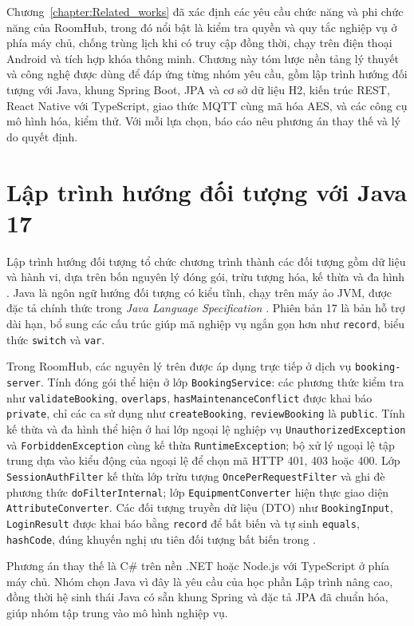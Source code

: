 \documentclass[../DoAn.tex]{subfiles}
\begin{document}
Chương~\ref{chapter:Related_works} đã xác định các yêu cầu chức năng và phi chức năng của RoomHub, trong đó nổi bật là kiểm tra quyền và quy tắc nghiệp vụ ở phía máy chủ, chống trùng lịch khi có truy cập đồng thời, chạy trên điện thoại Android và tích hợp khóa thông minh. Chương này tóm lược nền tảng lý thuyết và công nghệ được dùng để đáp ứng từng nhóm yêu cầu, gồm lập trình hướng đối tượng với Java, khung Spring Boot, JPA và cơ sở dữ liệu H2, kiến trúc REST, React Native với TypeScript, giao thức MQTT cùng mã hóa AES, và các công cụ mô hình hóa, kiểm thử. Với mỗi lựa chọn, báo cáo nêu phương án thay thế và lý do quyết định.

\section{Lập trình hướng đối tượng với Java 17}
\label{section:3.1}
Lập trình hướng đối tượng tổ chức chương trình thành các đối tượng gồm dữ liệu và hành vi, dựa trên bốn nguyên lý đóng gói, trừu tượng hóa, kế thừa và đa hình \cite{gamma1994design}. Java là ngôn ngữ hướng đối tượng có kiểu tĩnh, chạy trên máy ảo JVM, được đặc tả chính thức trong \emph{Java Language Specification} \cite{gosling2021jls}. Phiên bản 17 là bản hỗ trợ dài hạn, bổ sung các cấu trúc giúp mã nghiệp vụ ngắn gọn hơn như \texttt{record}, biểu thức \texttt{switch} và \texttt{var}.

Trong RoomHub, các nguyên lý trên được áp dụng trực tiếp ở dịch vụ \texttt{booking-server}. Tính đóng gói thể hiện ở lớp \texttt{BookingService}: các phương thức kiểm tra như \texttt{validateBooking}, \texttt{overlaps}, \texttt{hasMaintenanceConflict} được khai báo \texttt{private}, chỉ các ca sử dụng như \texttt{createBooking}, \texttt{reviewBooking} là \texttt{public}. Tính kế thừa và đa hình thể hiện ở hai lớp ngoại lệ nghiệp vụ \texttt{UnauthorizedException} và \texttt{ForbiddenException} cùng kế thừa \texttt{RuntimeException}; bộ xử lý ngoại lệ tập trung dựa vào kiểu động của ngoại lệ để chọn mã HTTP 401, 403 hoặc 400. Lớp \texttt{SessionAuthFilter} kế thừa lớp trừu tượng \texttt{OncePerRequestFilter} và ghi đè phương thức \texttt{doFilterInternal}; lớp \texttt{EquipmentConverter} hiện thực giao diện \texttt{AttributeConverter}. Các đối tượng truyền dữ liệu (DTO) như \texttt{BookingInput}, \texttt{LoginResult} được khai báo bằng \texttt{record} để bất biến và tự sinh \texttt{equals}, \texttt{hashCode}, đúng khuyến nghị ưu tiên đối tượng bất biến trong \cite{bloch2018effective}.

Phương án thay thế là C\# trên nền .NET hoặc Node.js với TypeScript ở phía máy chủ. Nhóm chọn Java vì đây là yêu cầu của học phần Lập trình nâng cao, đồng thời hệ sinh thái Java có sẵn khung Spring và đặc tả JPA đã chuẩn hóa, giúp nhóm tập trung vào mô hình nghiệp vụ.
\end{document}
